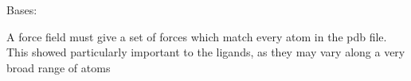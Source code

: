 \documentclass[letterpaper,10pt,english]{sphinxmanual}
\begin{document}
\begin{fulllineitems}
\label{\detokenize{protein:protein.Ligand}}
\pysigstartsignatures
{}
\pysigstopsignatures
\sphinxAtStartPar
Bases: {\hyperref[\detokenize{protein:protein.Compound}]{}}

\begin{fulllineitems}
\label{\detokenize{protein:protein.Ligand.check_forces}}
\pysigstartsignatures
{}
\pysigstopsignatures
\sphinxAtStartPar
A force field must give a set of forces which match every atom in
the pdb file. This showed particularly important to the ligands, as they
may vary along a very broad range of atoms

\end{fulllineitems}


\end{fulllineitems}

\end{document}

